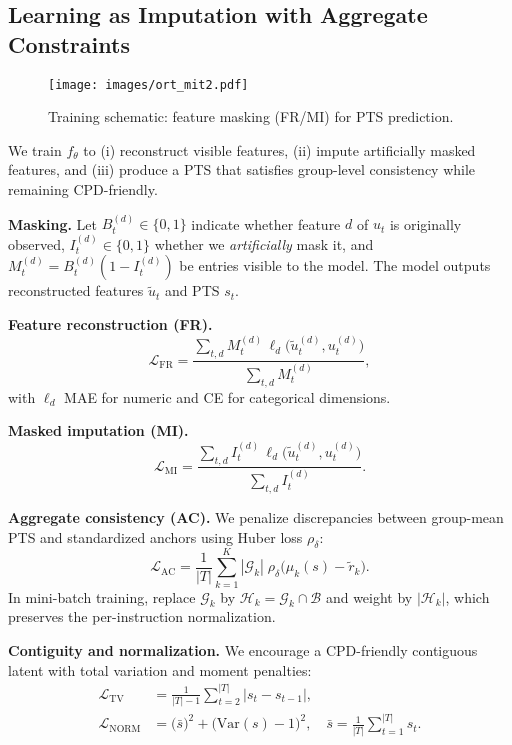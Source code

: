 \subsection{Learning as Imputation with Aggregate Constraints}

\begin{figure*}[!htbp]
\centering
\texttt{[image: images/ort\_mit2.pdf]}
\caption{Training schematic: feature masking (FR/MI) for PTS prediction.  }
\label{fig:saits}
\end{figure*}



\label{subsec:learning}
We train \(f_\theta\) to (i) reconstruct visible features, (ii) impute artificially masked features, and (iii) produce a PTS that satisfies group-level consistency while remaining CPD-friendly.

\textbf{Masking.}
Let \(B_t^{(d)}\in\{0,1\}\) indicate whether feature \(d\) of \(u_t\) is originally observed, \(I_t^{(d)}\in\{0,1\}\) whether we \emph{artificially} mask it, and \(M_t^{(d)}=B_t^{(d)}(1-I_t^{(d)})\) be entries visible to the model. The model outputs reconstructed features \(\tilde{u}_t\) and PTS \(s_t\).

\textbf{Feature reconstruction (FR).}
\begin{equation}
\label{eq:fr}
\mathcal{L}_{\mathrm{FR}}
=\frac{\sum_{t,d}M_t^{(d)}\,\ell_d\!\big(\tilde{u}_t^{(d)},u_t^{(d)}\big)}{\sum_{t,d}M_t^{(d)}},
\end{equation}
with \(\ell_d\) MAE for numeric and CE for categorical dimensions.

\textbf{Masked imputation (MI).}
\begin{equation}
\label{eq:mi}
\mathcal{L}_{\mathrm{MI}}
=\frac{\sum_{t,d}I_t^{(d)}\,\ell_d\!\big(\tilde{u}_t^{(d)},u_t^{(d)}\big)}{\sum_{t,d}I_t^{(d)}}.
\end{equation}

\textbf{Aggregate consistency (AC).}
We penalize discrepancies between group-mean PTS and standardized anchors using Huber loss \(\rho_\delta\):
\begin{equation}
\label{eq:ac}
\mathcal{L}_{\mathrm{AC}}
=\frac{1}{|T|}\sum_{k=1}^K |\mathcal{G}_k|\;
\rho_\delta\!\Big(\mu_k(s)-\tilde{r}_k\Big).
\end{equation}
In mini-batch training, replace \(\mathcal{G}_k\) by \(\mathcal{H}_k=\mathcal{G}_k\cap\mathcal{B}\) and weight by \(|\mathcal{H}_k|\), which preserves the per-instruction normalization.

\textbf{Contiguity and normalization.}
We encourage a CPD-friendly contiguous latent with total variation and moment penalties:
\begin{align}
\label{eq:tv}
\mathcal{L}_{\mathrm{TV}}&=\frac{1}{|T|-1}\sum_{t=2}^{|T|} |s_t-s_{t-1}|,\\
\label{eq:norm}
\mathcal{L}_{\mathrm{NORM}}&=\big(\bar{s}\big)^2+\big(\mathrm{Var}(s)-1\big)^2,\quad
\bar{s}=\tfrac{1}{|T|}\sum_{t=1}^{|T|} s_t.
\end{align}

